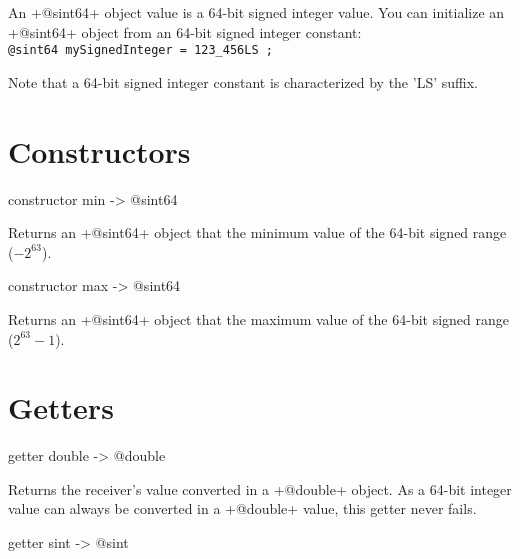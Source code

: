 

An \ggs+@sint64+ object value is a 64-bit signed integer value. You can initialize an \ggs+@sint64+ object from an 64-bit signed integer constant:\\

\texttt{@sint64 mySignedInteger = 123\_456LS ;}

Note that a 64-bit signed integer constant is characterized by the 'LS' suffix.

\section{Constructors}



\begin{galgascode}
constructor min -> @sint64
\end{galgascode}

Returns an \ggs+@sint64+ object that the minimum value of the 64-bit signed range ($-2^{63}$).






\begin{galgascode}
constructor max -> @sint64
\end{galgascode}

Returns an \ggs+@sint64+ object that the maximum value of the 64-bit signed range ($2^{63}-1$).


\section{Getters}



\begin{galgascode}
getter double -> @double
\end{galgascode}

Returns the receiver's value converted in a \ggs+@double+ object. As a 64-bit integer value can always be converted in a \ggs+@double+ value, this getter never fails.





\begin{galgascode}
getter sint -> @sint
\end{galgascode}

